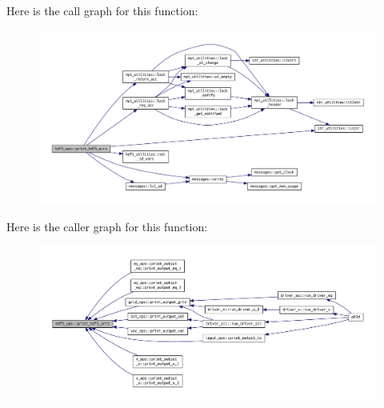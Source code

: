 Here is the call graph for this function\+:
\nopagebreak
\begin{figure}[H]
\begin{center}
\leavevmode
\includegraphics[width=350pt]{namespacehdf5__ops_a18a07099350020b44d6fbe93ed36e804_cgraph}
\end{center}
\end{figure}
Here is the caller graph for this function\+:
\nopagebreak
\begin{figure}[H]
\begin{center}
\leavevmode
\includegraphics[width=350pt]{namespacehdf5__ops_a18a07099350020b44d6fbe93ed36e804_icgraph}
\end{center}
\end{figure}
\mbox{\label{namespacehdf5__ops_a4d0ba813f369f904a9e991804662d099}} 
